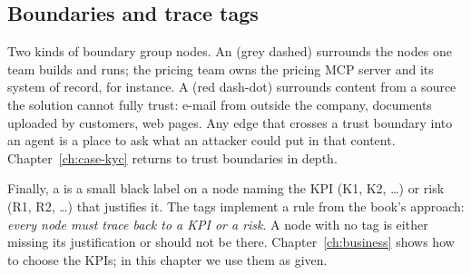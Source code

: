 \subsection{Boundaries and trace tags}

Two kinds of boundary group nodes. An  (grey dashed) surrounds the nodes one team builds and runs; the pricing team owns the pricing MCP server and its system of record, for instance. A  (red dash-dot) surrounds content from a source the solution cannot fully trust: e-mail from outside the company, documents uploaded by customers, web pages. Any edge that crosses a trust boundary into an agent is a place to ask what an attacker could put in that content. Chapter~\ref{ch:case-kyc} returns to trust boundaries in depth.

Finally, a  is a small black label on a node naming the KPI (\textsf{K1}, \textsf{K2}, \ldots) or risk (\textsf{R1}, \textsf{R2}, \ldots) that justifies it. The tags implement a rule from the book's approach: \emph{every node must trace back to a KPI or a risk}. A node with no tag is either missing its justification or should not be there. Chapter~\ref{ch:business} shows how to choose the KPIs; in this chapter we use them as given.

